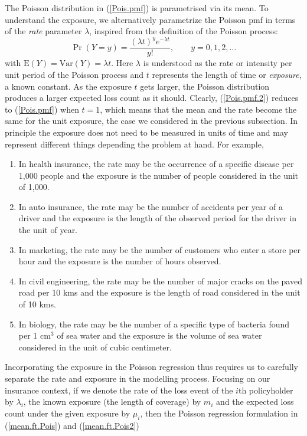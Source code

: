 \documentclass[12pt]{article}
\def\E{\mathrm{E}}
\def\Var{\mathrm{Var}}
\begin{document}
The Poisson distribution in (\ref{Pois.pmf}) is parametrised via its mean. To understand the exposure, we alternatively parametrize the Poisson pmf in terms of the \textit{rate} parameter $\lambda$, inspired from the definition of the Poisson process:
\begin{equation}
\label{Pois.pmf.2}
\Pr(Y=y)=\frac{(\lambda t)^y e^{-\lambda t}}{y!},\qquad y=0,1,2, \ldots
\end{equation} with $\E(Y)=\Var(Y)=\lambda t$. Here $\lambda$ is understood as the rate or intensity per unit period of the Poisson process and $t$ represents the length of time or \textit{exposure}, a known constant. As the exposure $t$ gets larger, the Poisson distribution produces a larger expected loss count as it should. 
Clearly, (\ref{Pois.pmf.2}) reduces to (\ref{Pois.pmf}) when $t=1$, which means that the mean and the rate become the same for the unit  exposure, the case we considered in the previous subsection. In principle the exposure does not need to be measured in units of time and may represent different things depending the problem at hand. For example,
\begin{enumerate}
  \item  In health insurance, the rate may be the occurrence of a specific disease per 1,000 people and the exposure is the number of people considered in the unit of 1,000.
    \item  In auto insurance, the rate may be the number of accidents per year of a driver and the exposure is the length of the observed period for the driver in the unit of year.

  \item In marketing, the rate may be  the number of customers who enter a store per hour and the exposure is the number of hours observed.
  \item In civil engineering, the rate may be  the number of major cracks on the paved road per 10 kms and the exposure is the length of road considered in the unit of 10 kms.
  \item In biology, the rate may be  the number of a specific type of bacteria found per 1 cm$^3$ of sea water and the exposure is the volume of sea water considered in the unit of cubic centimeter. 
\end{enumerate}
Incorporating the exposure in the Poisson regression thus requires us to carefully separate the rate and exposure in the modelling process. Focusing on our insurance context, if we denote the rate of the loss event of the $i$th policyholder by $\lambda_i$, the known exposure (the length of coverage) by  $m_i$ and the expected loss count under the given exposure by $\mu_i$, then  the Poisson regression formulation in (\ref{mean.ft.Pois}) and (\ref{mean.ft.Pois2}) 
\end{document}
